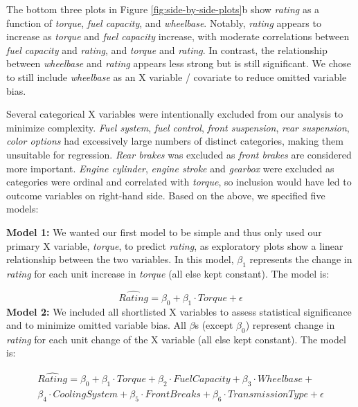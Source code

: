 \documentclass[
]{article}
\begin{document}
The bottom three plots in Figure \ref{fig:side-by-side-plots}b show
\emph{rating} as a function of \emph{torque}, \emph{fuel capacity}, and \emph{wheelbase}.
Notably, \emph{rating} appears to increase as \emph{torque} and \emph{fuel capacity}
increase, with moderate correlations between \emph{fuel capacity} and
\emph{rating}, and \emph{torque} and \emph{rating}. In contrast, the relationship
between \emph{wheelbase} and \emph{rating} appears less strong but is still
significant. We chose to still include \emph{wheelbase} as an X variable /
covariate to reduce omitted variable bias.

Several categorical X variables were intentionally excluded from our
analysis to minimize complexity. \emph{Fuel system}, \emph{fuel control}, \emph{front
suspension}, \emph{rear suspension}, \emph{color options} had excessively large
numbers of distinct categories, making them unsuitable for regression.
\emph{Rear brakes} was excluded as \emph{front brakes} are considered more
important. \emph{Engine cylinder}, \emph{engine stroke} and \emph{gearbox} were
excluded as categories were ordinal and correlated with \emph{torque}, so
inclusion would have led to outcome variables on right-hand side. Based
on the above, we specified five models:

\textbf{Model 1:} We wanted our first model to be simple and thus only used
our primary X variable, \emph{torque}, to predict \emph{rating}, as exploratory
plots show a linear relationship between the two variables. In this
model, \(\beta_1\) represents the change in \emph{rating} for each unit
increase in \emph{torque} (all else kept constant). The model is:

\[
  \widehat{Rating}=\beta_0 + \beta_1\cdot Torque + \epsilon
\] \textbf{Model 2:} We included all shortlisted X variables to assess
statistical significance and to minimize omitted variable bias. All
\(\beta\)s (except \(\beta_0\)) represent change in \emph{rating} for each unit
change of the X variable (all else kept constant). The model is:

\begin{equation}
  \begin{aligned}
      \widehat{Rating}=\beta_0 + \beta_1\cdot Torque +
             \beta_2\cdot Fuel Capacity +
               \beta_3\cdot Wheelbase + \\
                 \beta_4\cdot Cooling System +
                  \beta_5\cdot Front Breaks +
                   \beta_6\cdot Transmission Type
                      + \epsilon
  \end{aligned}
\end{equation}
\end{document}
